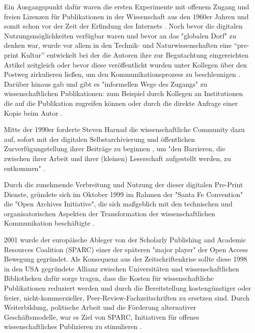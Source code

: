 Ein Ausgangspunkt dafür waren die ersten Experimente mit offenem Zugang und freien Lizenzen für Publikationen in der Wissenschaft aus den 1960er Jahren und somit schon vor der Zeit der Erfindung des Internets \cite{cite:18b}. Noch bevor die digitalen Nutzungsmöglichkeiten verfügbar waren und bevor an das "globalen Dorf"\cite{mcluhan_1962_gutenberg} zu denken war, wurde vor allem in den Technik- und Naturwissenschaften eine “pre-print Kultur” entwickelt bei der die Autoren ihre zur Begutachtung eingereichten Artikel zeitgleich oder bevor diese veröffentlicht wurden unter Kollegen über den Postweg zirkulieren ließen, um den Kommunikationsprozess zu beschleunigen \cite{suchen-Hoffmann-Zugang-undVerwertung-oeffentlicher-Informationen}. Darüber hinaus gab und gibt es "informellen Wege des Zugangs" zu wissenschaftlichen Publikationen: zum Beispiel durch Kollegen an Institutionen die auf die Publikation zugreifen können oder durch die direkte Anfrage einer Kopie beim Autor \cite{davis_2011_open}.

Mitte der 1990er forderte Steven Harnad die wissenschaftliche Community dazu auf, sofort mit der digitalen Selbstarchivierung und öffentlichen Zurverfügungstellung ihrer Beiträge zu beginnen \cite{albert_2006_open_implications}, um "den Barrieren, die zwischen ihrer Arbeit und ihrer (kleinen) Leserschaft aufgestellt werden, zu entkommen" \cite{harnad_1995_subversive_proposal}.

Durch die zunehmende Verbreitung und Nutzung der dieser digitalen Pre-Print Dienste, gründete sich im Oktober 1999 im Rahmen der "Santa Fe Convention" die "Open Archives Initiative", die sich maßgeblich mit den technischen und organisatorischen Aspekten der Transformation der wissenschaftlichen Kommunikation beschäftigte \cite{van_2000_santa_fe}.

2001 wurde der europäische Ableger von der Scholarly Publishing and Academic Resources Coalition (SPARC) einer der späteren "major player" der Open Access Bewegung \cite{russell2008business} \cite{Herb_2012} gegründet. Als Konsequenz aus der Zeitschriftenkrise sollte diese 1998 in den USA gegründete Allianz zwischen Universitäten und wissenschaftlichen Bibliotheken dafür sorge tragen, dass die Kosten für wissenschaftliche Publikationen reduziert werden und durch die Bereitstellung kostengünstiger oder freier, nicht-kommerzieller, Peer-Review-Fachzeitschriften zu ersetzen sind. Durch Weiterbildung, politische Arbeit und die Förderung alternativer Geschäftsmodelle, war es Ziel von SPARC, Initiativen für offenes wissenschaftliches Publizieren zu stimulieren \cite{suchen}.

